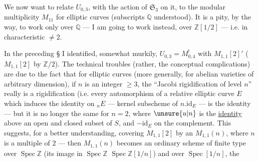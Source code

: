 
We now want to relate
$U_{0,3}$, with the action of $\mathfrak{S}_3$
on it, to the modular multiplicity
$M_{11}$ for elliptic curves
(subscripts $\mathbb{Q}$ understood). It is
a pity, by the way, to work only over $\mathbb{Q}$ --- I am going to work
instead, over $\mathbb{Z}[1/2]$ --- i.e. in  characteristic $\ne 2$.


In the preceding \S{} I identified, somewhat
murkily, $U_{0,3}=M^{!}_{0,4}$\unsure{,} with $M_{1,1}[2]'$\unsure{,}
( $M_{1,1}[2]$
 by
$\mathbb{Z}/2$). The technical troubles (rather,
the conceptual complications) are due
to the fact that for elliptic curves
(more generally, for abelian varieties of
arbitrary dimension), if $n$ is an integer $\ge 3$,
the ``Jacobi rigidification of level $n$''
really is a rigidification (i.e.
every automorphism of a relative elliptic curve
$E$ which induces the identity on
${}_nE$ --- kernel subscheme of $n.\mathrm{id}_E$ --- is
the identity --- but it is no longer the
same for $n=2$, where $\unsure{u|n}$ is the \uline{identity}  above
an open and closed subset of $S$, and $-\mathrm{id}_E$
on the complement. This suggests, for
a better understanding, covering
$M_{1,1}[2]$ by an $M_{1,1}(n)$, where $n$ is a
multiple of $2$ --- then $M_{1,1}(n)$ becomes an
ordinary scheme of finite type over $\operatorname{Spec}\mathbb{Z}$
(its image in $\operatorname{Spec}\mathbb{Z}$   $\operatorname{Spec}\mathbb{Z}[1/n]$)
and over $\operatorname{Spec}[1/n]$, the 

